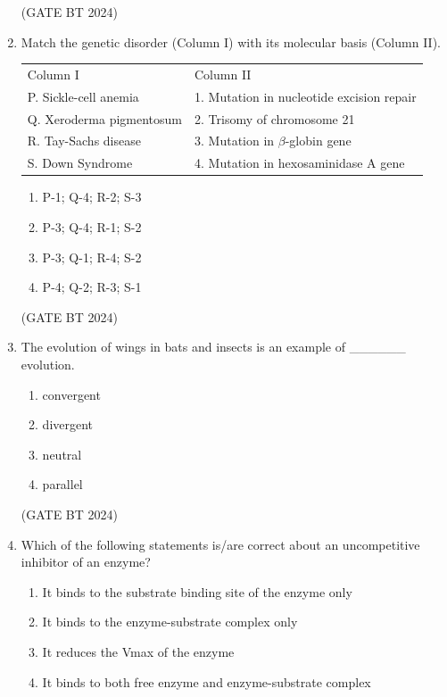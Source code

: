 \documentclass[journal,12pt,onecolumn]{IEEEtran}
\theoremstyle{remark}
\begin{document}
\begin{enumerate}
\hfill (GATE BT 2024)

\item Match the genetic disorder (Column I) with its molecular basis (Column II).

\begin{tabular}{ll}
Column I & Column II \\
P. Sickle-cell anemia & 1. Mutation in nucleotide excision repair \\
Q. Xeroderma pigmentosum & 2. Trisomy of chromosome 21 \\
R. Tay-Sachs disease & 3. Mutation in $\beta$-globin gene \\
S. Down Syndrome & 4. Mutation in hexosaminidase A gene \\
\end{tabular}

\begin{enumerate}
    \item P-1; Q-4; R-2; S-3 
    \item P-3; Q-4; R-1; S-2 
    \item P-3; Q-1; R-4; S-2 
    \item P-4; Q-2; R-3; S-1
\end{enumerate}

\hfill (GATE BT 2024)

\item The evolution of wings in bats and insects is an example of \_\_\_\_\_\_ evolution.

\begin{enumerate}
    \item convergent 
    \item divergent 
    \item neutral 
    \item parallel
\end{enumerate}

\hfill (GATE BT 2024)

\item Which of the following statements is/are correct about an uncompetitive inhibitor of an enzyme?

\begin{enumerate}
    \item It binds to the substrate binding site of the enzyme only \
    \item It binds to the enzyme-substrate complex only 
    \item It reduces the Vmax of the enzyme 
    \item It binds to both free enzyme and enzyme-substrate complex
\end{enumerate}


\end{enumerate}
\end{document}
